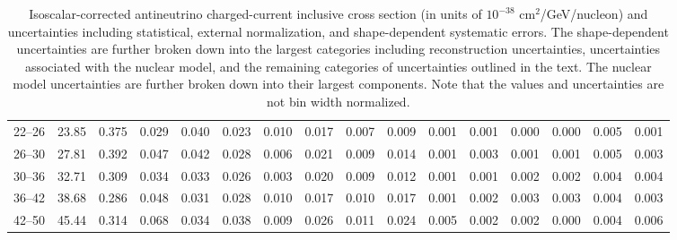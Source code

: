 \begin{turnpage}
\begin{table}[ptbh]
\begin{tabular}{cccccc|cccc|cccccc}
 22--26 & 	 23.85 & 	 0.375 &  	 0.029 &  	 0.040 &  	 0.023 &  	 0.010 &  	 0.017 &  	 0.007 &  	 0.009 &  	 0.001 &  	 0.001 &  	 0.000 &  	 0.000 &  	 0.005 &  	 0.001 \\ 
 26--30 & 	 27.81 & 	 0.392 &  	 0.047 &  	 0.042 &  	 0.028 &  	 0.006 &  	 0.021 &  	 0.009 &  	 0.014 &  	 0.001 &  	 0.003 &  	 0.001 &  	 0.001 &  	 0.005 &  	 0.003 \\ 
 30--36 & 	 32.71 & 	 0.309 &  	 0.034 &  	 0.033 &  	 0.026 &  	 0.003 &  	 0.020 &  	 0.009 &  	 0.012 &  	 0.001 &  	 0.001 &  	 0.002 &  	 0.002 &  	 0.004 &  	 0.004 \\ 
 36--42 & 	 38.68 & 	 0.286 &  	 0.048 &  	 0.031 &  	 0.028 &  	 0.010 &  	 0.017 &  	 0.010 &  	 0.017 &  	 0.001 &  	 0.002 &  	 0.003 &  	 0.003 &  	 0.004 &  	 0.003 \\ 
 42--50 & 	 45.44 & 	 0.314 &  	 0.068 &  	 0.034 &  	 0.038 &  	 0.009 &  	 0.026 &  	 0.011 &  	 0.024 &  	 0.005 &  	 0.002 &  	 0.002 &  	 0.000 &  	 0.004 &  	 0.006 \\ 
 \hline
 \end{tabular}
\caption{Isoscalar-corrected antineutrino charged-current inclusive cross section (in units of $10^{-38}$ cm$^2$/GeV/nucleon) and uncertainties including statistical, external normalization, and shape-dependent systematic errors. The shape-dependent uncertainties are further broken down into the largest categories including reconstruction uncertainties, uncertainties associated with the nuclear model, and the remaining categories of uncertainties outlined in the text. The nuclear model uncertainties are further broken down into their largest components. Note that the values and uncertainties are not bin width normalized.} 
\label{tbl:RHC-anti-xsec}
\end{table}

\end{turnpage}